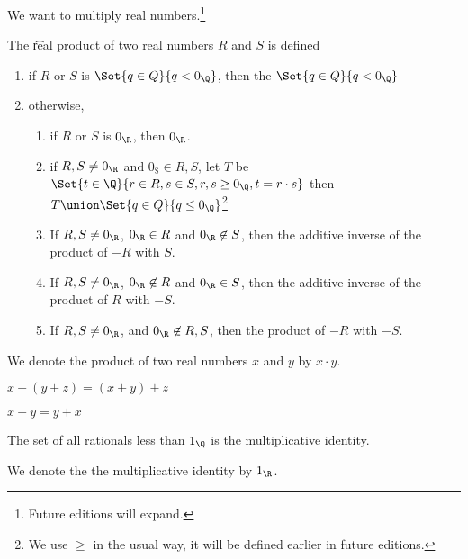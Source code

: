 

We want to multiply real numbers.\footnote{Future editions will expand.}


The \t{real product} of two real numbers $R$ and $S$ is defined
\begin{enumerate}
  \item if $R$ or $S$ is $\Set{q \in Q}{q < 0_{\Q}}$, then the $\Set{q \in Q}{q < 0_{\Q}}$
  \item otherwise,
  \begin{enumerate}
    \item if $R$ or $S$ is $0_{\R}$, then $0_{\R}$.
    \item if $R,S \neq 0_{\R}$ and $0_{\$} \in R, S$, let $T$ be $\Set{t \in \Q}{r \in R, s \in S, r, s \geq 0_{\Q}, t = r\cdot s}$ then $T \union \Set{q \in Q}{q \leq 0_{\Q}}$\footnote{We use $\geq$ in the usual way, it will be defined earlier in future editions.}
    \item If $R, S \neq 0_{\R}$, $0_{\R} \in R$ and $0_{\R} \not\in S$, then the additive inverse of the product of $-R$ with $S$.
    \item If $R, S \neq 0_{\R}$, $0_{\R} \not\in R$ and $0_{\R} \in S$, then the additive inverse of the product of $R$ with $-S$.
    \item If $R, S \neq 0_{\R}$, and $0_{\R} \not\in R,S$, then the product of $-R$ with $-S$.
  \end{enumerate}
\end{enumerate}


We denote the product of two real numbers $x$ and $y$ by $x \cdot y$.


\begin{proposition}[Associative]
  $x + (y + z) = (x + y) + z$
\end{proposition}

\begin{proposition}[Commutative]
  $x + y = y + x$
\end{proposition}

\begin{proposition}[Identity]
  The set of all rationals less than $1_{\Q}$ is the multiplicative identity.
\end{proposition}

We denote the the multiplicative identity by $1_{\R}$.

